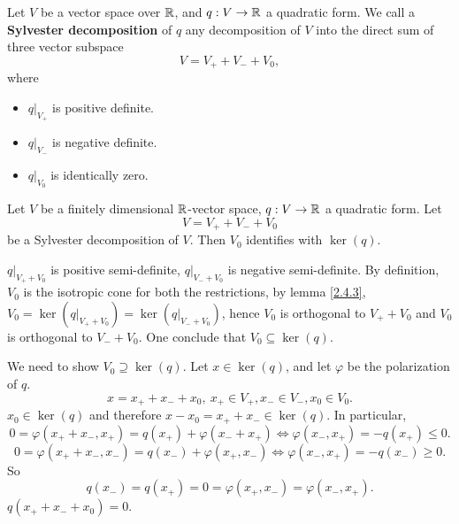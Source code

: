 \begin{definitionenv}
    Let $V$ be a vector space over $\mathbb{R}$, and $q: V\rightarrow \mathbb{R}$ a quadratic form.
    We call a \textbf{Sylvester decomposition} of $q$ any decomposition of $V$ into the direct sum of three vector subspace
    $$ V = V_+ + V_- +V_0,$$
    where
    \begin{itemize}
        \item $q|_{V_+}$ is positive definite.
        \item $q|_{V_-}$ is negative definite.
        \item $q|_{V_0}$ is identically zero.
    \end{itemize}
\end{definitionenv}
\begin{propositionenv}
    Let $V$ be a finitely dimensional $\mathbb{R}$-vector space, $q: V\rightarrow \mathbb{R}$ a quadratic form.
    Let 
    $$ V = V_+ + V_- + V_0$$
    be a Sylvester decomposition of $V$. Then $V_0$ identifies with $\ker(q)$.
\end{propositionenv}
\begin{proofenv}
    $q|_{V_+ + V_0}$ is positive semi-definite, $q|_{V_- + V_0}$ is negative semi-definite.
    By definition, $V_0$ is the isotropic cone for both the restrictions, by lemma \ref{2.4.3}, $V_0 = \ker \left(q|_{V_+ + V_0}\right) = \ker\left(q|_{V_-+V_0}\right)$, hence $V_0$ is orthogonal to $V_+ + V_0$ and $V_0$ is orthogonal to $V_- + V_0$.
    One conclude that $V_0\subseteq \ker (q)$.

    \quad We need to show $V_0 \supseteq \ker(q)$.
    Let $x \in \ker(q)$, and let $\varphi$ be the polarization of $q$.
    $$ x = x_+ +x_- + x_0,\ x_+ \in V_+, x_- \in V_-, x_0\in V_0.$$
    $x_0 \in \ker(q)$ and therefore $x - x_0 = x_+ + x_- \in \ker(q)$.
    In particular,
    $$ 0 = \varphi(x_+ +x_- ,x_+) = q(x_+) + \varphi(x_- + x_+) \Leftrightarrow \varphi (x_-,x_+) = -q(x_+) \le 0.$$
    $$ 0 = \varphi(x_+ + x_-,x_-) = q(x_-) + \varphi(x_+,x_-) \Leftrightarrow \varphi(x_-, x_+) = -q(x_-) \ge 0.$$
    So 
    $$ q(x_-) = q(x_+)= 0 =\varphi(x_+,x_-) = \varphi(x_-,x_+).$$
    $q(x_+ +x_- +x_0) = 0.$
\end{proofenv}


